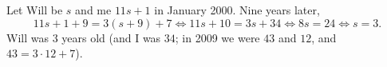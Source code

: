 Let Will be $s$ and me $11s+1$ in January 2000. Nine years later,
\[11s+1+9=3(s+9)+7\iff11s+10=3s+34\iff8s=24\iff s=3.\]
Will was $\boxed{3}$ years old (and I was $34$; in 2009 we were $43$ and $12$, and $43=3\cdot12+7$).
